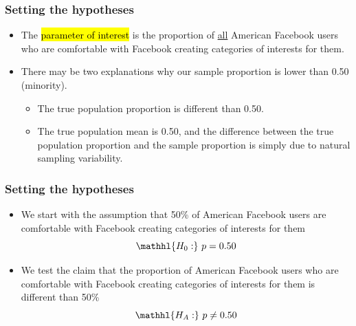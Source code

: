 \documentclass[t,compress,mathserif]{beamer}
\begin{document}
\begin{frame}
\frametitle{Setting the hypotheses}

\begin{itemize}

\item The \hl{parameter of interest} is the proportion of \underline{all} American Facebook users who are comfortable with Facebook creating categories of interests for them.

\pause

\item There may be two explanations why our sample proportion is lower than 0.50 (minority).
\begin{itemize}
\item The true population proportion is different than 0.50.
\item The true population mean is 0.50, and the difference between the true population proportion and the sample proportion is simply due to natural sampling variability.
\end{itemize}

 \end{itemize}

\end{frame}


\begin{frame}
\frametitle{Setting the hypotheses}

\begin{itemize}

\item We start with the assumption that 50\% of American Facebook users are comfortable with Facebook creating categories of interests for them
\[ \mathhl{H_0:}~p = 0.50 \]

\pause

\item We test the claim that the proportion of American Facebook users who are comfortable with Facebook creating categories of interests for them is different than 50\%
\[ \mathhl{H_A:}~p \ne 0.50 \]

\end{itemize}

\end{frame}

\end{document}
